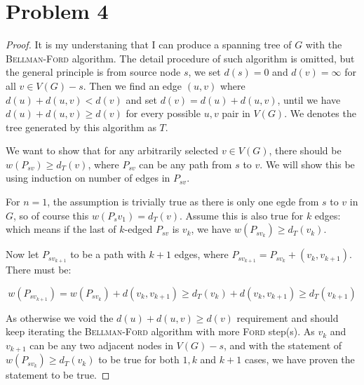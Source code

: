 \documentclass[11pt]{article}
\begin{document}
\section*{Problem 4}

\begin{proof}

It is my understaning that I can produce a spanning tree of $G$ with the \textsc{Bellman-Ford} algorithm. The detail procedure of such algorithm is omitted, but the general principle is from source node $s$, we set $d(s) = 0$ and $d(v) = \infty$ for all $v \in V(G) - s$. Then we find an edge $(u, v)$ where $d(u) + d(u, v) < d(v)$ and set $d(v) = d(u) + d(u,v)$, until we have $d(u) + d(u, v) \geq d(v)$ for every possible $u, v$ pair in $V(G)$. We denotes the tree generated by this algorithm as $T$.\newline

We want to show that for any arbitrarily selected $v \in V(G)$, there should be $w(P_{sv}) \geq d_T(v)$, where $P_{sv}$ can be any path from $s$ to $v$.  We will show this be using induction on number of edges in $P_{sv}$.

For $n = 1$, the assumption is trivially true as there is only one egde from $s$ to $v$ in $G$, so of course this $w(P_sv_1) = d_T(v)$. Assume this is also true for $k$ edges: which means if the last of $k$-edged $P_{sv}$ is $v_k$, we have $w(P_{sv_k}) \geq d_T(v_k)$.

Now let $P_{sv_{k+1}}$ to be a path with $k+1$ edges, where $P_{sv_{k+1}} = P_{sv_k} + (v_k, v_{k+1})$. There must be:

\begin{equation*}
    w(P_{sv_{k+1}}) = w(P_{sv_k}) + d(v_k, v_{k+1}) \geq d_T(v_k) + d(v_k, v_{k+1}) \geq d_T(v_{k+1})
\end{equation*}

As otherwise we void the $d(u) + d(u, v) \geq d(v)$ requirement and should keep iterating the \textsc{Bellman-Ford} algorithm with more \textsc{Ford} step(s). As $v_k$ and $v_{k+1}$ can be any two adjacent nodes in $V(G) - s$, and with the statement of $w(P_{sv_k}) \geq d_T(v_k)$ to be true for both $1, k$ and $k+1$ cases, we have proven the statement to be true.

\end{proof}

%
% 
% 
\end{document}

